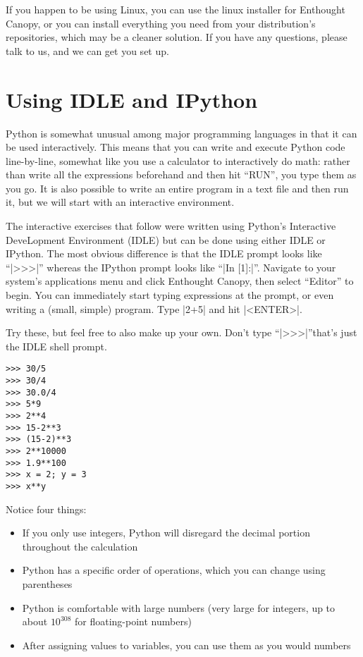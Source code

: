 \documentclass{article}
\begin{document}
If you happen to be using Linux, you can use the linux installer for Enthought Canopy, or you can install everything you need from your distribution's repositories, which may be a cleaner solution.  If you have any questions, please talk to us, and we can get you set up.

\section{Using IDLE and IPython}
Python is somewhat unusual among major programming languages in that it can be used interactively.
This means that you can write and execute Python code line-by-line, somewhat like you use a calculator to
interactively do math: rather than write all the expressions beforehand and then
hit ``RUN'', you type them as you go.  It is also possible to write an entire program in a text file and then run it, but we will start with an interactive environment.

The interactive exercises that follow were written using Python's Interactive DeveLopment Environment (IDLE) but can be done using either IDLE or IPython.  The most obvious difference is that the IDLE prompt looks like ``|>>>|'' whereas the IPython prompt looks like ``|In [1]:|''. Navigate to your system's applications menu and click Enthought Canopy, then select ``Editor'' to begin.  You can immediately start typing expressions at the prompt, or even writing a (small, simple)
program.  Type |2+5| and hit |<ENTER>|.

Try these, but feel free to also make up your own.  Don't type
``|>>>|''\textemdash that's just the IDLE shell prompt.
\begin{Verbatim}
>>> 30/5
>>> 30/4
>>> 30.0/4
>>> 5*9
>>> 2**4
>>> 15-2**3
>>> (15-2)**3
>>> 2**10000
>>> 1.9**100
>>> x = 2; y = 3
>>> x**y
\end{Verbatim}

Notice four things:
\begin{itemize}
 \item If you only use integers, Python will disregard the decimal portion throughout the calculation
 \item Python has a specific order of operations, which you can change using parentheses
 \item Python is comfortable with large numbers (very large for integers, up to
about $10^{308}$ for floating-point numbers)
 \item After assigning values to variables, you can use them as you would numbers
\end{itemize}
\end{document}

